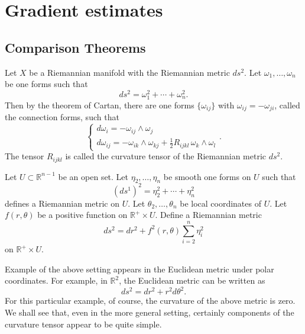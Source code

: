 
\chapter{Gradient estimates}\label{Gradient_estimate}
\section{Comparison Theorems}\label{Comparison_theorems}

Let $X$ be a Riemannian manifold with the Riemannian metric $ds^2$. Let $ \omega_1, \ldots, \omega_n $ be one forms such that 
%
\[ d s^2 = \omega ^2_1 + \cdots + \omega ^2_n. \]
%
Then by the theorem of Cartan, there are one forms $ \{ \omega_{ij} \} $ with $ \omega_{ij} = - \omega _{ji} $, called the connection forms, such that 
%
\[ \left\{ \begin{array}{ll} d \omega_i = - \omega_{ij} \wedge \omega_j \\
d \omega _{ij} = - \omega _{ik} \wedge \omega_{kj} + \frac{1}{2} R_{ij kl} \, \omega _k \wedge \omega _l \end{array} \right. .\]
%
The tensor $R_{ij k l} $ is called the curvature tensor of the Riemannian metric $ d s^2 $.

Let $ U \subset \mathbb{R} ^{n-1} $ be an open set. Let $ \eta _2 , \ldots, \eta _n $ be smooth one forms on $ U$ such that  
%
\[ (ds^1)^2 = \eta ^2_2 + \cdots + \eta ^2_n \]
defines a Riemannian metric on $U$. Let $ \theta _2, \ldots, \theta _n $ be local coordinates of $U$. Let $ f (r, \theta) $ be a positive function on $ \mathbb{R}^+ \times U$. Define a Riemannian metric 
%
\[ ds^2 = d r ^2 + f^2 (r, \theta) \sum ^n _{i=2} \eta ^2 _i \]
on $ \mathbb{R} ^+ \times U$. 



 Example of the above setting appears in the Euclidean metric under polar coordinates. For example, in $ \mathbb{R} ^2$, the Euclidean metric can be written as 
%
\[ d s^2 = d r^2 + r ^2 d \theta^2.\]
For this particular example,
of course, the curvature of the above metric is zero. We shall see that, even in the more general 
setting, certainly components of the curvature tensor appear to be  quite simple.

